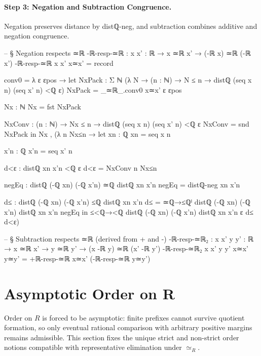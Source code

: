 \documentclass[11pt,a4paper]{book}
\def\mathbb#1{#1}%
\def\texttt#1{#1}%
\def\texorpdfstring#1#2{#2}%
\begin{document}
\paragraph{Step 3: Negation and Subtraction Congruence.}
Negation preserves distance by \texttt{distℚ-neg}, and subtraction
combines additive and negation congruence.

\begin{code}
-- § Negation respects ≃ℝ
-ℝ-resp-≃ℝ : {x x' : ℝ} → x ≃ℝ x' → (-ℝ x) ≃ℝ (-ℝ x')
-ℝ-resp-≃ℝ {x} {x'} x≃x' = record
  { conv0 = λ ε εpos →
      let
        NxPack : Σ ℕ (λ N → (n : ℕ) → N ≤ n → distℚ (seq x n) (seq x' n) <ℚ ε)
        NxPack = _≃ℝ_.conv0 x≃x' ε εpos

        Nx : ℕ
        Nx = fst NxPack

        NxConv : (n : ℕ) → Nx ≤ n → distℚ (seq x n) (seq x' n) <ℚ ε
        NxConv = snd NxPack
      in
      Nx , (λ n Nx≤n →
        let
          xn : ℚ
          xn = seq x n

          x'n : ℚ
          x'n = seq x' n

          d<ε : distℚ xn x'n <ℚ ε
          d<ε = NxConv n Nx≤n

          negEq : distℚ (-ℚ xn) (-ℚ x'n) ≃ℚ distℚ xn x'n
          negEq = distℚ-neg xn x'n

          d≤ : distℚ (-ℚ xn) (-ℚ x'n) ≤ℚ distℚ xn x'n
          d≤ = ≃ℚ→≤ℚˡ {distℚ (-ℚ xn) (-ℚ x'n)} {distℚ xn x'n} negEq
        in
        ≤<ℚ→<ℚ {distℚ (-ℚ xn) (-ℚ x'n)} {distℚ xn x'n} {ε} d≤ d<ε)
  }

-- § Subtraction respects ≃ℝ (derived from + and -)
-ℝ-resp-≃ℝ₂ : {x x' y y' : ℝ} → x ≃ℝ x' → y ≃ℝ y' → (x -ℝ y) ≃ℝ (x' -ℝ y')
-ℝ-resp-≃ℝ₂ {x} {x'} {y} {y'} x≃x' y≃y' =
  +ℝ-resp-≃ℝ x≃x' (-ℝ-resp-≃ℝ y≃y')
\end{code}


\section{Asymptotic Order on \texorpdfstring{$\mathbb{R}$}{R}}

Order on $\mathbb{R}$ is forced to be asymptotic: finite prefixes cannot survive quotient formation, so only eventual rational comparison with arbitrary positive margins remains admissible. This section fixes the unique strict and non-strict order notions compatible with representative elimination under $\simeq_{\mathbb{R}}$.
\end{document}
